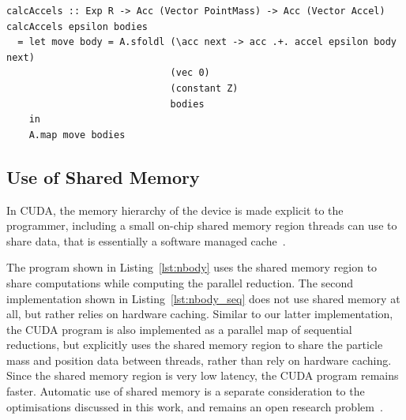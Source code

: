 \begin{lstlisting}[style=haskell_float
    ,label=lst:nbody_seq
    ,caption={$N$-body gravitational simulation, using sequential reduction}]
calcAccels :: Exp R -> Acc (Vector PointMass) -> Acc (Vector Accel)
calcAccels epsilon bodies
  = let move body = A.sfoldl (\acc next -> acc .+. accel epsilon body next)
                             (vec 0)
                             (constant Z)
                             bodies
    in
    A.map move bodies
\end{lstlisting}


\subsection{Use of Shared Memory}

In CUDA, the memory hierarchy of the device is made explicit to the programmer,
including a small on-chip shared memory region threads can use to share data,
that is essentially a software managed cache~\cite{NVIDIA:2012wf}.

The program shown in Listing~\ref{lst:nbody} uses the shared memory region to
share computations while computing the parallel reduction. The second
implementation shown in Listing~\ref{lst:nbody_seq} does not use shared memory
at all, but rather relies on hardware caching. Similar to our latter
implementation, the CUDA program is also implemented as a parallel map of
sequential reductions, but explicitly uses the shared memory region to share the
particle mass and position data between threads, rather than rely on hardware
caching. Since the shared memory region is very low latency, the CUDA program
remains faster. Automatic use of shared memory is a separate consideration to
the optimisations discussed in this work, and remains an open research
problem~\cite{Ma:2010ft}.



